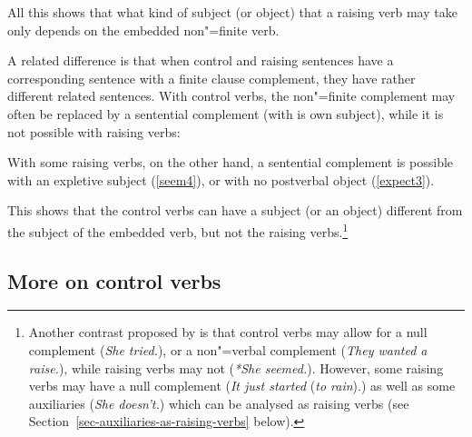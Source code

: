 \noindent
All this shows that what kind of subject (or object) that a raising verb may take only depends on the embedded
non"=finite verb.

A related difference is that when control and raising sentences have a corresponding sentence with a finite clause complement, they have rather different related sentences.
With control verbs, the non"=finite complement may often be replaced by a sentential complement (with is own subject), while it is not possible with raising verbs:

\eal
{}
\zl

\eal
{}
\zl

With some raising verbs, on the other hand, a sentential complement is possible with an expletive
subject (\ref{seem4}), or with no postverbal object (\ref{expect3}). 

\eal
{}
\zl

\noindent
This shows that the control verbs can have a subject (or an object) different from the subject of
the embedded verb, but not the raising verbs.\footnote{%
  Another contrast proposed by
  is that control verbs may allow for a null complement (\emph{She tried.}), or
  a non"=verbal complement (\emph{They wanted a raise.}), while raising verbs may not (\emph{*She
    seemed.}). However, some raising verbs may have a null complement (\emph{It just
    started} (\emph{to rain}).) as well as some auxiliaries (\emph{She doesn't.}) which can be analysed as raising verbs (see
  Section~\ref{sec-auxiliaries-as-raising-verbs} below).%
} 

\subsection{More on control verbs}

